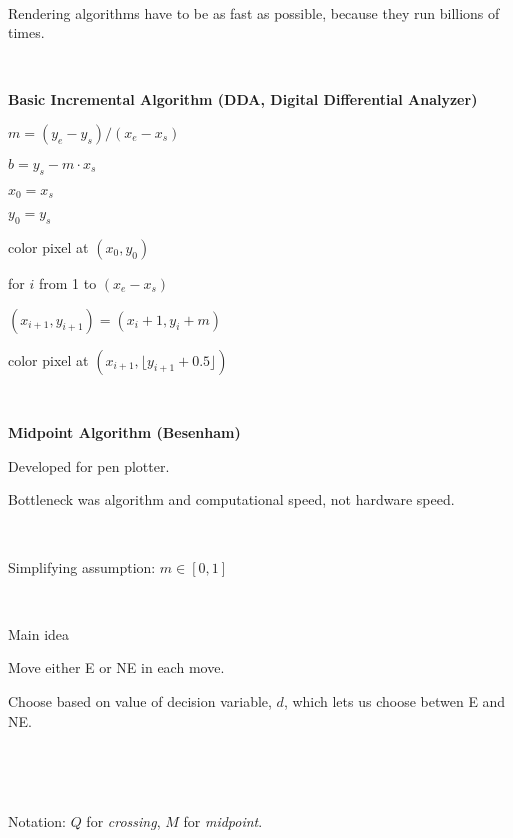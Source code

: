 \

Rendering algorithms have to be as fast as possible, because they run billions of times.  

\

{\bf Basic Incremental Algorithm (DDA, Digital Differential Analyzer)}

$m = (y_e - y_s) / (x_e - x_s)$

$b = y_s - m \cdot x_s$

$x_0 = x_s$

$y_0 = y_s$

color pixel at $(x_0,y_0)$

for $i$ from 1 to $(x_e - x_s)$

\qquad $(x_{i+1}, y_{i+1}) = (x_i + 1, y_i + m)$

\qquad color pixel at $(x_{i+1}, \lfloor y_{i+1} + 0.5 \rfloor )$ 

\

{\bf Midpoint Algorithm (Besenham)}

Developed for pen plotter.

Bottleneck was algorithm and computational speed, not hardware speed.

\

Simplifying assumption:  $m \in [0,1]$

\

Main idea

\qquad Move either E or NE in each move.  

\qquad Choose based on value of decision variable, $d$, which lets us choose betwen E and NE.  

\

\

\hfil{}

Notation:   $Q$ for {\it crossing}, $M$ for {\it midpoint}.

